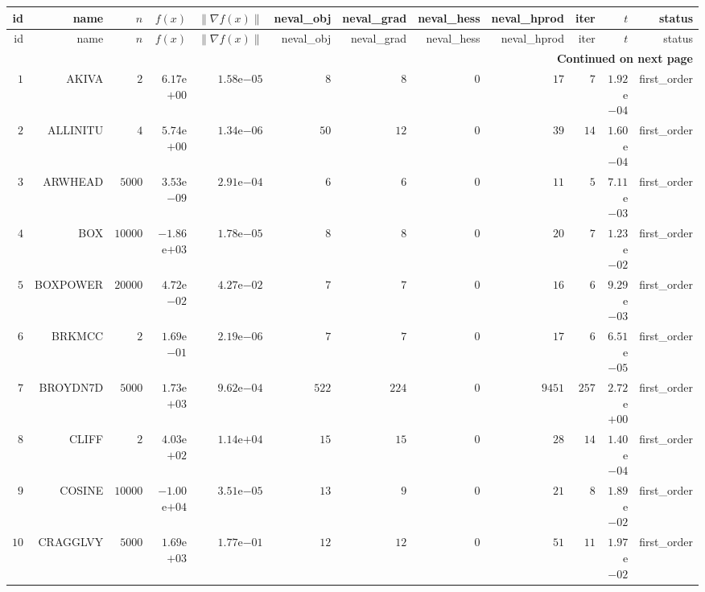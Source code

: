 \begin{longtable}{rrrrrrrrrrrr}
  \hline
  id & name & \(n\) & \(f(x)\) & \(\|\nabla f(x)\|\) & neval\_obj & neval\_grad & neval\_hess & neval\_hprod & iter & \(t\) & status \\\hline
  \endfirsthead
  \hline
  id & name & \(n\) & \(f(x)\) & \(\|\nabla f(x)\|\) & neval\_obj & neval\_grad & neval\_hess & neval\_hprod & iter & \(t\) & status \\\hline
  \endhead
  \hline
  \multicolumn{12}{r}{{\bfseries Continued on next page}}\\
  \hline
  \endfoot
  \endlastfoot
  \(     1\) & AKIVA & \(     2\) & \( 6.17\)e\(+00\) & \( 1.58\)e\(-05\) & \(     8\) & \(     8\) & \(     0\) & \(    17\) & \(     7\) & \( 1.92\)e\(-04\) & first\_order \\
  \(     2\) & ALLINITU & \(     4\) & \( 5.74\)e\(+00\) & \( 1.34\)e\(-06\) & \(    50\) & \(    12\) & \(     0\) & \(    39\) & \(    14\) & \( 1.60\)e\(-04\) & first\_order \\
  \(     3\) & ARWHEAD & \(  5000\) & \( 3.53\)e\(-09\) & \( 2.91\)e\(-04\) & \(     6\) & \(     6\) & \(     0\) & \(    11\) & \(     5\) & \( 7.11\)e\(-03\) & first\_order \\
  \(     4\) & BOX & \( 10000\) & \(-1.86\)e\(+03\) & \( 1.78\)e\(-05\) & \(     8\) & \(     8\) & \(     0\) & \(    20\) & \(     7\) & \( 1.23\)e\(-02\) & first\_order \\
  \(     5\) & BOXPOWER & \( 20000\) & \( 4.72\)e\(-02\) & \( 4.27\)e\(-02\) & \(     7\) & \(     7\) & \(     0\) & \(    16\) & \(     6\) & \( 9.29\)e\(-03\) & first\_order \\
  \(     6\) & BRKMCC & \(     2\) & \( 1.69\)e\(-01\) & \( 2.19\)e\(-06\) & \(     7\) & \(     7\) & \(     0\) & \(    17\) & \(     6\) & \( 6.51\)e\(-05\) & first\_order \\
  \(     7\) & BROYDN7D & \(  5000\) & \( 1.73\)e\(+03\) & \( 9.62\)e\(-04\) & \(   522\) & \(   224\) & \(     0\) & \(  9451\) & \(   257\) & \( 2.72\)e\(+00\) & first\_order \\
  \(     8\) & CLIFF & \(     2\) & \( 4.03\)e\(+02\) & \( 1.14\)e\(+04\) & \(    15\) & \(    15\) & \(     0\) & \(    28\) & \(    14\) & \( 1.40\)e\(-04\) & first\_order \\
  \(     9\) & COSINE & \( 10000\) & \(-1.00\)e\(+04\) & \( 3.51\)e\(-05\) & \(    13\) & \(     9\) & \(     0\) & \(    21\) & \(     8\) & \( 1.89\)e\(-02\) & first\_order \\
  \(    10\) & CRAGGLVY & \(  5000\) & \( 1.69\)e\(+03\) & \( 1.77\)e\(-01\) & \(    12\) & \(    12\) & \(     0\) & \(    51\) & \(    11\) & \( 1.97\)e\(-02\) & first\_order \\

\end{longtable}
